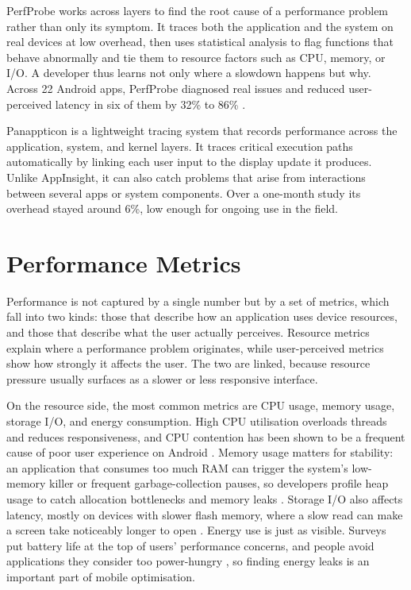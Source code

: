 PerfProbe \cite{PerfProbe} works across layers to find the root cause of a performance problem rather than only its symptom. It traces both the application and the system on real devices at low overhead, then uses statistical analysis to flag functions that behave abnormally and tie them to resource factors such as CPU, memory, or I/O. A developer thus learns not only where a slowdown happens but why. Across 22 Android apps, PerfProbe diagnosed real issues and reduced user-perceived latency in six of them by 32\% to 86\% \cite{PerfProbe}.

Panappticon \cite{Panappticon} is a lightweight tracing system that records performance across the application, system, and kernel layers. It traces critical execution paths automatically by linking each user input to the display update it produces. Unlike AppInsight, it can also catch problems that arise from interactions between several apps or system components. Over a one-month study its overhead stayed around 6\%, low enough for ongoing use in the field.


\section{Performance Metrics}
Performance is not captured by a single number but by a set of metrics, which fall into two kinds: those that describe how an application uses device resources, and those that describe what the user actually perceives. Resource metrics explain where a performance problem originates, while user-perceived metrics show how strongly it affects the user. The two are linked, because resource pressure usually surfaces as a slower or less responsive interface.

On the resource side, the most common metrics are CPU usage, memory usage, storage I/O, and energy consumption. High CPU utilisation overloads threads and reduces responsiveness, and CPU contention has been shown to be a frequent cause of poor user experience on Android \cite{Yaohui}. Memory usage matters for stability: an application that consumes too much RAM can trigger the system's low-memory killer or frequent garbage-collection pauses, so developers profile heap usage to catch allocation bottlenecks and memory leaks \cite{DroidPerf}. %
Storage I/O also affects latency, mostly on devices with slower flash memory, where a slow read can make a screen take noticeably longer to open \cite{AndroStep}. Energy use is just as visible. Surveys put battery life at the top of users' performance concerns, and people avoid applications they consider too power-hungry \cite{Saraiva}, so finding energy leaks is an important part of mobile optimisation.

